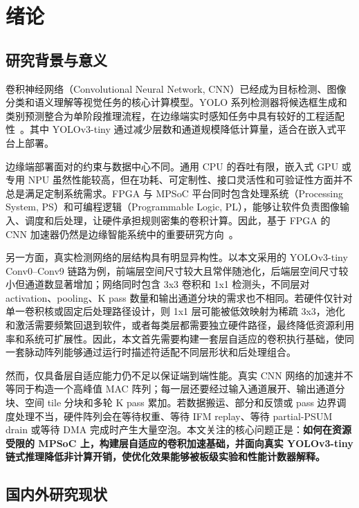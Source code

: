 \chapter{绪论}
\label{chap:introduction}

\section{研究背景与意义}

卷积神经网络（Convolutional Neural Network, CNN）已经成为目标检测、图像分类和语义理解等视觉任务的核心计算模型。YOLO 系列检测器将候选框生成和类别预测整合为单阶段推理流程，在边缘端实时感知任务中具有较好的工程适配性~\cite{redmon2016yolo,redmon2018yolov3}。其中 YOLOv3-tiny 通过减少层数和通道规模降低计算量，适合在嵌入式平台上部署。

边缘端部署面对的约束与数据中心不同。通用 CPU 的吞吐有限，嵌入式 GPU 或专用 NPU 虽然性能较高，但在功耗、可定制性、接口灵活性和可验证性方面并不总是满足定制系统需求。FPGA 与 MPSoC 平台同时包含处理系统（Processing System, PS）和可编程逻辑（Programmable Logic, PL），能够让软件负责图像输入、调度和后处理，让硬件承担规则密集的卷积计算。因此，基于 FPGA 的 CNN 加速器仍然是边缘智能系统中的重要研究方向~\cite{qiu2016going,guo2019angeleye}。

另一方面，真实检测网络的层结构具有明显异构性。以本文采用的 YOLOv3-tiny Conv0--Conv9 链路为例，前端层空间尺寸较大且常伴随池化，后端层空间尺寸较小但通道数显著增加；网络同时包含 3x3 卷积和 1x1 检测头，不同层对 activation、pooling、K pass 数量和输出通道分块的需求也不相同。若硬件仅针对单一卷积核或固定后处理路径设计，则 1x1 层可能被低效映射为稀疏 3x3，池化和激活需要频繁回退到软件，或者每类层都需要独立硬件路径，最终降低资源利用率和系统可扩展性。因此，本文首先需要构建一套层自适应的卷积执行基础，使同一套脉动阵列能够通过运行时描述符适配不同层形状和后处理组合。

然而，仅具备层自适应能力仍不足以保证端到端性能。真实 CNN 网络的加速并不等同于构造一个高峰值 MAC 阵列；每一层还要经过输入通道展开、输出通道分块、空间 tile 分块和多轮 K pass 累加。若数据搬运、部分和反馈或 pass 边界调度处理不当，硬件阵列会在等待权重、等待 IFM replay、等待 partial-PSUM drain 或等待 DMA 完成时产生大量空泡。本文关注的核心问题正是：\textbf{如何在资源受限的 MPSoC 上，构建层自适应的卷积加速基础，并面向真实 YOLOv3-tiny 链式推理降低非计算开销，使优化效果能够被板级实验和性能计数器解释。}

\section{国内外研究现状}

